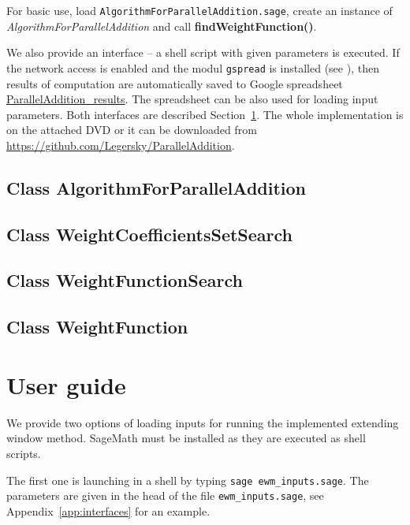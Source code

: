 For basic use, load \verb+AlgorithmForParallelAddition.sage+, create an instance of \emph{AlgorithmForParallelAddition} and call \textbf{findWeightFunction()}.

We also provide an interface -- a shell script with given parameters is executed. If the network access is enabled and the modul \verb+gspread+ is installed (see \cite{gspread}), then results of computation are automatically saved to Google spreadsheet \href{https://docs.google.com/spreadsheets/d/1TnhrHdefHfHa0WSeVs4q6XVj3epjPlPlnoekE0E1xeM/edit?usp=sharing}{ParallelAddition\_results}. The spreadsheet can be also used for loading input parameters. Both interfaces are described Section~\ref{sec:interfaces}. The whole implementation is on the attached DVD or it can be downloaded from  \url{https://github.com/Legersky/ParallelAddition}.



\subsection*{Class AlgorithmForParallelAddition}



\subsection*{Class WeightCoefficientsSetSearch}



\subsection*{Class WeightFunctionSearch}



\subsection*{Class WeightFunction}



\section{User guide}
\label{sec:interfaces}
We provide two options of loading inputs for running the implemented extending window method. SageMath must be installed as they are executed as shell scripts.

The first one is launching in a shell by typing \verb+sage ewm_inputs.sage+. The parameters are given in the head of the file \verb+ewm_inputs.sage+, see 
Appendix~\ref{app:interfaces} for an example.

